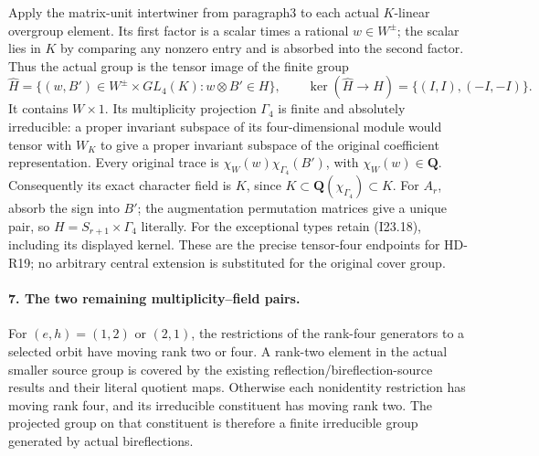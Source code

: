 Apply the matrix-unit intertwiner from paragraph3 to each actual
\(K\)-linear overgroup element. Its first factor is a scalar
times a rational \(w\in W^{\pm}\); the scalar lies in \(K\)
by comparing any nonzero entry and is absorbed into the second
factor. Thus the actual group is the tensor image of the finite
group
\[
 \widehat H=\{(w,B')\in W^{\pm}\times GL_4(K):w\otimes B'\in H\},
 \qquad\ker(\widehat H\to H)=\{(I,I),(-I,-I)\}.             \tag{I23.18}
\]
It contains \(W\times1\). Its multiplicity projection
\(\Gamma_4\) is finite and absolutely irreducible: a proper
invariant subspace of its four-dimensional module would tensor
with \(W_K\) to give a proper invariant subspace of the
original coefficient representation. Every original trace is
\(\chi_W(w)\chi_{\Gamma_4}(B')\), with \(\chi_W(w)\in\mathbf Q\).
Consequently its exact character field is \(K\), since
\(K\subset\mathbf Q(\chi_{\Gamma_4})\subset K\).
For \(A_r\), absorb the sign into \(B'\); the
augmentation permutation matrices give a unique pair, so
\(H=S_{r+1}\times\Gamma_4\) literally. For the exceptional
types retain (I23.18), including its displayed kernel. These
are the precise tensor-four endpoints for HD-R19; no arbitrary
central extension is substituted for the original cover group.

\paragraph{7. The two remaining multiplicity--field pairs.}
For \((e,h)=(1,2)\) or \((2,1)\), the restrictions of the
rank-four generators to a selected orbit have moving rank two
or four. A rank-two element in the actual smaller source group
is covered by the existing reflection/bireflection-source results
and their literal quotient maps. Otherwise each nonidentity
restriction has moving rank four, and its irreducible
constituent has moving rank two. The projected group on that
constituent is therefore a finite irreducible group generated
by actual bireflections.

